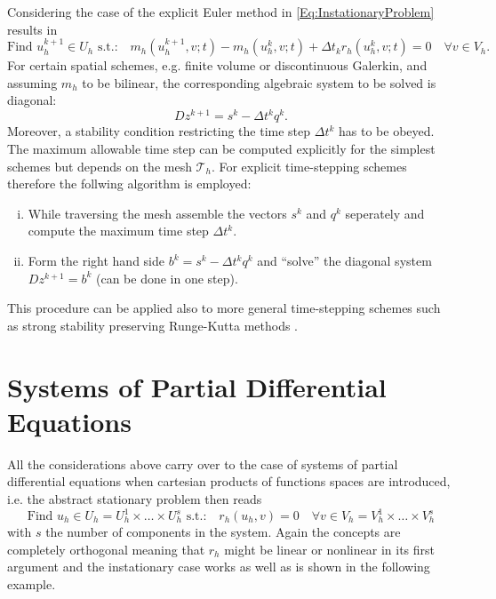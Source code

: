 \documentclass[a4paper,12pt]{article}
\theoremstyle{definition}
\begin{document}
Considering the case of the explicit Euler method in \eqref{Eq:InstationaryProblem}
results in
\begin{equation*}
\text{Find $u_h^{k+1}\in U_h$ s.t.:} 
\quad m_h(u_h^{k+1},v;t)-m_h(u_h^{k},v;t) +
\Delta t_k r_h(u_h^{k},v;t) = 0 
\quad \forall v\in V_h.
\end{equation*}
For certain spatial schemes, e.g. finite volume or discontinuous Galerkin,
and assuming $m_h$ to be bilinear, the corresponding algebraic system
to be solved is diagonal:
\begin{equation}
Dz^{k+1} = s^k - \Delta t^k q^k.
\end{equation}
Moreover, a stability condition restricting the time step $\Delta t^k$ 
has to be obeyed. The maximum allowable time step can be computed
explicitly for the simplest schemes but depends on the mesh $\mathcal{T}_h$.
For explicit time-stepping schemes therefore the follwing algorithm is employed:
\begin{enumerate}[i)]
\item While traversing the mesh assemble the vectors $s^k$ and
$q^k$ seperately and compute the maximum time step $\Delta t^k$.
\item Form the right hand side $b^k=s^k - \Delta t^k q^k$ and ``solve'' the 
diagonal system $Dz^{k+1} = b^k$ (can be done in one step).
\end{enumerate}
This procedure can be applied also to more general time-stepping schemes
such as strong stability preserving Runge-Kutta methods \cite{shu:88}.

\section{Systems of Partial Differential Equations}

All the considerations above carry over to the case of systems of
partial differential equations when cartesian products of
functions spaces are introduced, i.e. the abstract stationary problem then reads
\begin{equation}
\text{Find $u_h\in U_h=U_h^1\times \ldots \times U_h^s$ s.t.:} \quad r_h(u_h,v)=0 
\quad \forall v\in V_h=V_h^1\times\ldots\times V_h^s
\label{Eq:BasicSystemBuildingBlock}
\end{equation}
with $s$ the number of components in the system. Again the concepts
are completely orthogonal meaning that $r_h$ might be linear or nonlinear
in its first argument and the instationary case works as well as is shown
in the following example.
\end{document}
